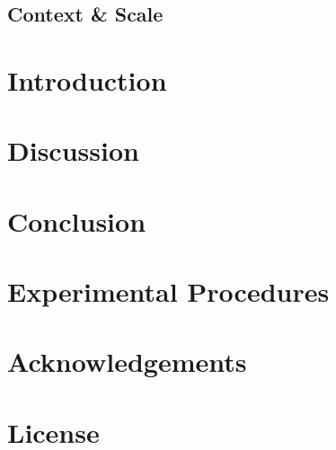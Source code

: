 \documentclass[11pt,1p]{elsarticle}
\begin{document}
\begin{shaded}
\vspace{-0.5cm}
\section*{Context \& Scale}

\end{shaded}

\section*{Introduction}
\label{sec:intro}






\section*{Discussion}
\label{sec:discussion}



\section*{Conclusion}
\label{sec:conclusion}



\section*{Experimental Procedures}
\label{sec:methods}

\begin{small}

\end{small}

\section*{Acknowledgements}
\small


\section*{License}
\end{document}
